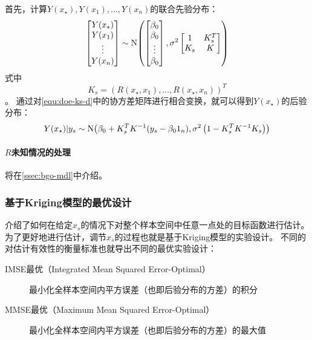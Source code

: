 \documentclass[index]{subfiles}
\begin{document}
首先，计算$Y(x_\star),Y(x_1),\ldots,Y(x_n)$的联合先验分布：
\begin{equation}\label{equ:doe-ks-d}
  \begin{bmatrix} Y(x_\star) \\ Y(x_1) \\ \vdots \\ Y(x_n) \end{bmatrix}
  \sim \Normal{
    \begin{bmatrix} \beta_0 \\ \beta_0 \\ \vdots \\ \beta_0 \end{bmatrix}
  }{\sigma^2
    \begin{bmatrix}
      1 & K_s^T \\
      K_s & K
    \end{bmatrix}
  }
\end{equation}
式中
\begin{equation}\label{equ:doe-ks}
  K_s = \left(R(x_\star, x_1), \ldots, R(x_\star, x_n)\right)^T
\end{equation}
。
通过对\cref{equ:doe-ks-d}中的协方差矩阵进行相合变换\cite{rasmussen2004}，就可以得到$Y(x_\star)$的后验分布：
\begin{equation}\label{equ:doe-y}
  Y(x_\star)|y_s \sim \Normal{\beta_0 + K_s^T K^{-1} (y_s - \beta_0 \one_n)}{\sigma^2 \left(1 - K_s^T K^{-1} K_s\right)}
\end{equation}

\paragraph{$R$未知情况的处理} 将在\cref{ssec:bgo-mdl}中介绍。

\subsubsection{基于Kriging模型的最优设计}\label{sssec:doe-k-o}
介绍了如何在给定$x_s$的情况下对整个样本空间中任意一点处的目标函数进行估计。
为了更好地进行估计，调节$x_s$的过程也就是基于Kriging模型的实验设计\cite{pronzato2012}。
不同的对估计有效性的衡量标准也就导出不同的最优实验设计：
\begin{description}
  \item[IMSE最优（Integrated Mean Squared Error-Optimal）]\cite{sacks1989} 最小化全样本空间内平方误差（也即后验分布的方差）的积分
  \item[MMSE最优（Maximum Mean Squared Error-Optimal）]\cite{sacks1989} 最小化全样本空间内平方误差（也即后验分布的方差）的最大值
\end{description}
\end{document}
